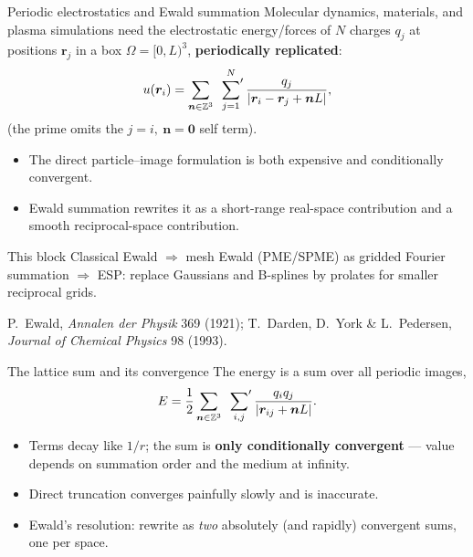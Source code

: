 \documentclass[aspectratio=169,11pt]{beamer}
\newcommand{\Z}{\mathbb{Z}}
\newcommand{\nnn}{\bm{n}}
\newcommand{\rr}{\bm{r}}
\newcommand{\hl}[1]{{\color{CCMorange}\textbf{#1}}}
\newcommand{\gray}[1]{{\color{mygray}#1}}
\begin{document}
\begin{frame}{Periodic electrostatics and Ewald summation}
\small
Molecular dynamics, materials, and plasma simulations need the electrostatic energy/forces of \(N\) charges \(q_j\) at positions \(\rr_j\) in a box \(\Omega=[0,L)^3\), \hl{periodically replicated}:
\[
  u(\rr_i)=\sum_{\nnn\in\Z^3}\ \sideset{}{'}\sum_{j=1}^{N}\frac{q_j}{|\rr_i-\rr_j+\nnn L|},
\]
(the prime omits the \(j=i,\ \nnn=\bm0\) self term).
\begin{itemize}
  \item The direct particle--image formulation is both expensive and conditionally convergent.
  \item Ewald summation rewrites it as a short-range real-space contribution and a smooth reciprocal-space contribution.
\end{itemize}
\begin{block}{This block}
Classical Ewald \(\Rightarrow\) mesh Ewald (PME/SPME) as gridded Fourier
summation \(\Rightarrow\) ESP: replace Gaussians and B-splines by prolates for
smaller reciprocal grids.
\end{block}
{\scriptsize\gray{P.\ Ewald, \emph{Annalen der Physik} 369 (1921); T.\ Darden, D.\ York \& L.\ Pedersen, \emph{Journal of Chemical Physics} 98 (1993).}}
\end{frame}

\begin{frame}{The lattice sum and its convergence}
\small
The energy is a sum over all periodic images,
\[
  E=\frac12\sum_{\nnn\in\Z^3}\ \sideset{}{'}\sum_{i,j}\frac{q_iq_j}{|\rr_{ij}+\nnn L|}.
\]
\begin{itemize}
  \item Terms decay like \(1/r\); the sum is \hl{only conditionally convergent} --- value depends on summation order and the medium at infinity.
  \item Direct truncation converges painfully slowly and is inaccurate.
  \item Ewald's resolution: rewrite as \emph{two} absolutely (and rapidly) convergent sums, one per space.
\end{itemize}
\end{frame}
\end{document}
